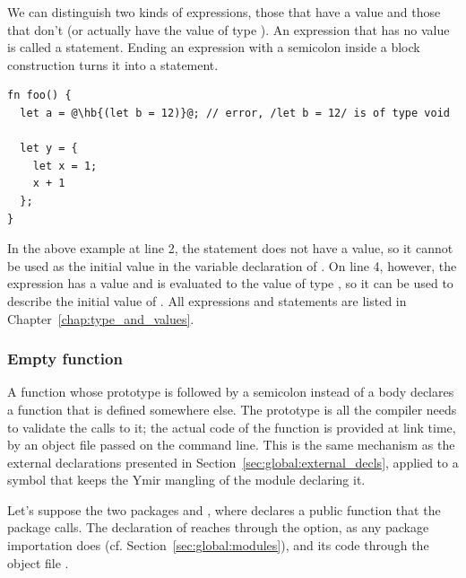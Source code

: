 We can distinguish two kinds of expressions, those that have a value and those
that don't (or actually have the value  of type ). An
expression that has no value is called a statement. Ending an expression with a
semicolon inside a block construction turns it into a statement.

\begin{lstlisting}[style=coloredverbatimError, escapechar=@]
fn foo() {
  let a = @\hb{(let b = 12)}@; // error, /let b = 12/ is of type void

  let y = {
    let x = 1;
    x + 1
  };
}
\end{lstlisting}

In the above example at line 2, the statement  does not have
a value, so it cannot be used as the initial value in the variable declaration
of . On line 4, however, the expression 
has a value and is evaluated to the value  of type , so it
can be used to describe the initial value of . All expressions and
statements are listed in Chapter~\ref{chap:type_and_values}.

\subsubsection*{Empty function}

A function whose prototype is followed by a semicolon instead of a body declares
a function that is defined somewhere else. The prototype is all the compiler
needs to validate the calls to it; the actual code of the function is provided
at link time, by an object file passed on the command line. This is the same
mechanism as the external declarations presented in
Section~\ref{sec:global:external_decls}, applied to a symbol that keeps the Ymir
mangling of the module declaring it.

Let's suppose the two packages  and , where 
declares a public function  that the package 
calls. The declaration of  reaches  through the
 option, as any package importation does
(cf. Section~\ref{sec:global:modules}), and its code through the object file
.

